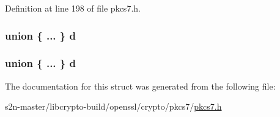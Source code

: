 Definition at line 198 of file pkcs7.\+h.

\subsubsection[{\texorpdfstring{d}{d}}]{\setlength{\rightskip}{0pt plus 5cm}union \{ ... \}   d}\hypertarget{structpkcs7__st_a6df8107bfb152de565203c8cbf5d56e8}{}\label{structpkcs7__st_a6df8107bfb152de565203c8cbf5d56e8}
\subsubsection[{\texorpdfstring{d}{d}}]{\setlength{\rightskip}{0pt plus 5cm}union \{ ... \}   d}\hypertarget{structpkcs7__st_a9306a9ea59a2f55473b63e1e35cff721}{}\label{structpkcs7__st_a9306a9ea59a2f55473b63e1e35cff721}


The documentation for this struct was generated from the following file\+:\begin{DoxyCompactItemize}
\item 
s2n-\/master/libcrypto-\/build/openssl/crypto/pkcs7/\hyperlink{crypto_2pkcs7_2pkcs7_8h}{pkcs7.\+h}\end{DoxyCompactItemize}
